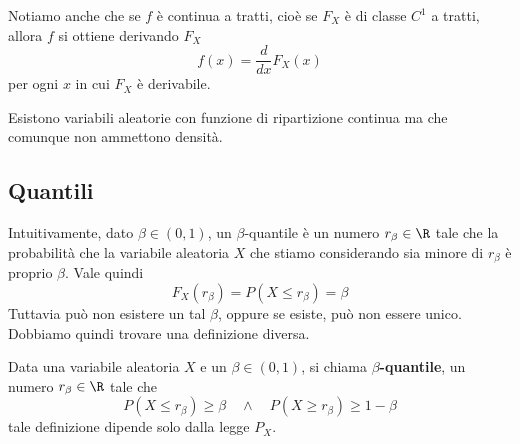 \begin{center}
\end{center}

\begin{observation}
	Notiamo anche che se $f$ è continua a tratti, cioè
	se $F_X$ è di classe $C^1$ a tratti, allora $f$ si ottiene derivando $F_X$
	\[ f(x) = \frac{d}{dx} F_X (x) \]
	per ogni $x$ in cui $F_X$ è derivabile.
\end{observation}

\begin{observation}
	Esistono variabili aleatorie con funzione di ripartizione continua ma che comunque non
	ammettono densità.
\end{observation}

\subsection{Quantili}
Intuitivamente, dato $\beta \in (0,1)$, un $\beta$-quantile è un numero $r_\beta \in \R$ tale che
la probabilità che la variabile aleatoria $X$ che stiamo considerando sia minore di $r_\beta$ è
proprio $\beta$. Vale quindi
\[ F_X (r_\beta) = P(X \leq r_\beta) = \beta \]
Tuttavia può non esistere un tal $\beta$, oppure se esiste, può non essere unico. Dobbiamo quindi
trovare una definizione diversa.

\begin{definition}\label{def: quantile}
	Data una variabile aleatoria $X$ e un $\beta \in (0,1)$, si chiama $\beta$\textbf{-quantile},
	un numero $r_\beta \in \R$ tale che
	\[ P(X \leq r_\beta) \geq \beta \quad \land \quad P(X \geq r_\beta) \geq 1 - \beta \]
	tale definizione dipende solo dalla legge $P_X$.
\end{definition}


